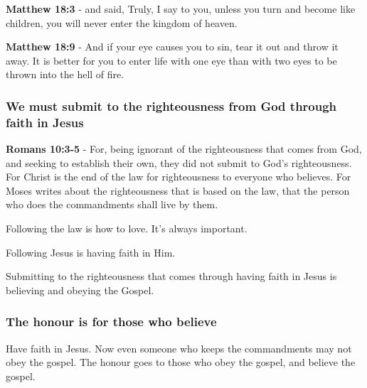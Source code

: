 \documentclass[11pt]{article}
\begin{document}
\textbf{Matthew 18:3} - and said, Truly, I say to you, unless you turn and become like children, you will never enter the kingdom of heaven.

\textbf{Matthew 18:9} - And if your eye causes you to sin, tear it out and throw it away. It is better for you to enter life with one eye than with two eyes to be thrown into the hell of fire.

\subsubsection{We must submit to the righteousness from God through faith in Jesus}
\label{sec:orgcae5bbb}
\textbf{Romans 10:3-5} - For, being ignorant of the righteousness that comes from God, and seeking to establish their own, they did not submit to God's righteousness. For Christ is the end of the law for righteousness to everyone who believes. For Moses writes about the righteousness that is based on the law, that the person who does the commandments shall live by them.

Following the law is how to love. It's always important.

Following Jesus is having faith in Him.

Submitting to the righteousness that comes through having faith in Jesus is believing and obeying the Gospel.

\subsubsection{The honour is for those who believe}
\label{sec:org979aa71}
Have faith in Jesus.
Now even someone who keeps the commandments may not obey the gospel.
The honour goes to those who obey the gospel, and believe the gospel.
\end{document}
